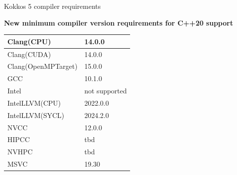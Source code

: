 \begin{frame}[fragile]{Kokkos 5 compiler requirements}

\textbf{New minimum compiler version requirements for C++20 support}

\begin{center}
\begin{tabular}{l|l}
  Clang(CPU)          & 14.0.0 \\ \hline
  Clang(CUDA)         & 14.0.0 \\ \hline
  Clang(OpenMPTarget) & 15.0.0 \\ \hline
  GCC                 & 10.1.0 \\ \hline
  Intel               & not supported \\ \hline
  IntelLLVM(CPU)      & 2022.0.0 \\ \hline
  IntelLLVM(SYCL)     & 2024.2.0 \\ \hline
  NVCC                & 12.0.0 \\ \hline
  HIPCC               & tbd \\ \hline
  NVHPC               & tbd \\ \hline
  MSVC                & 19.30
\end{tabular}
\vspace{-10pt}
\end{center}
\end{frame}


